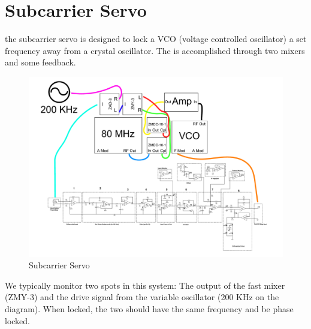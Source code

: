 \section{Subcarrier Servo}
the subcarrier servo is designed to lock a VCO (voltage controlled oscillator) a set frequency away from a crystal oscillator. The is accomplished through two mixers and some feedback. 

\begin{figure}%
\includegraphics[width=1.35\textwidth,angle=90]{figures/controls/SubcarrierServo}%
\caption[Subcarrier Servo]{Subcarrier Servo}%
\label{fig:subcarrierservo}%
\end{figure}

We typically monitor two spots in this system: The output of the fast mixer (ZMY-3) and the drive signal from the variable oscillator (200 KHz on the diagram). When locked, the two should have the same frequency and be phase locked.


